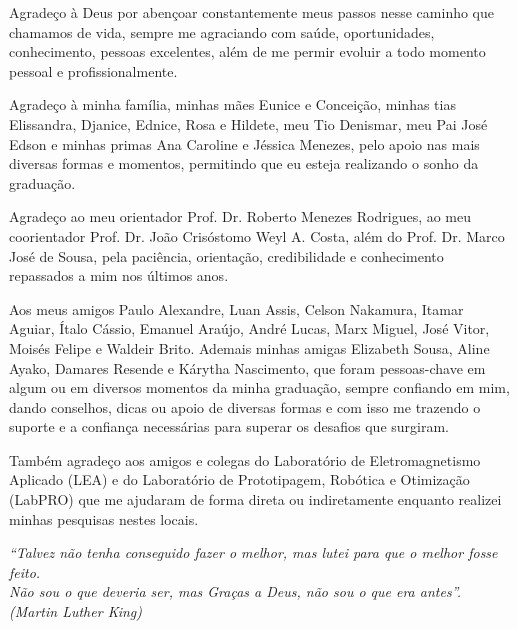 \documentclass[
	12pt,				%
	openright,			%
	oneside,			%
	a4paper,			%
	english,			%
	brazil				%
	]{abntex2}
\begin{document}
\begin{agradecimentos}
Agradeço à Deus por abençoar constantemente meus passos nesse caminho que chamamos de vida, sempre me agraciando com saúde, oportunidades, conhecimento, pessoas excelentes, além de me permir evoluir a todo momento pessoal e profissionalmente.

Agradeço à minha família, minhas mães Eunice e Conceição, minhas tias Elissandra, Djanice, Ednice, Rosa e Hildete, meu Tio Denismar, meu Pai José Edson e minhas primas Ana Caroline e Jéssica Menezes, pelo apoio nas mais diversas formas e momentos, permitindo que eu esteja realizando o sonho da graduação. 

Agradeço ao meu orientador Prof. Dr. Roberto Menezes Rodrigues, ao meu coorientador Prof. Dr. João Crisóstomo Weyl A. Costa, além do Prof. Dr. Marco José de Sousa, pela paciência, orientação, credibilidade e conhecimento repassados a mim nos últimos anos.

Aos meus amigos Paulo Alexandre, Luan Assis, Celson Nakamura, Itamar Aguiar, Ítalo Cássio, Emanuel Araújo, André Lucas, Marx Miguel, José Vitor, Moisés Felipe e Waldeir Brito. Ademais minhas amigas Elizabeth Sousa, Aline Ayako, Damares Resende e Kárytha Nascimento, que foram pessoas-chave em algum ou em diversos momentos da minha graduação, sempre confiando em mim, dando conselhos, dicas ou apoio de diversas formas e com isso me trazendo o suporte e a confiança necessárias para superar os desafios que surgiram.

	Também agradeço aos amigos e colegas do Laboratório de Eletromagnetismo Aplicado (LEA) e do Laboratório de Prototipagem, Robótica e Otimização (LabPRO) que me ajudaram de forma direta ou indiretamente enquanto realizei minhas pesquisas nestes locais.


\end{agradecimentos}

\begin{epigrafe}
    \vspace*{\fill}
	\begin{flushright}
		\textit{``Talvez não tenha conseguido fazer o melhor, mas lutei para que o melhor fosse feito. \\ Não sou o que deveria ser, mas Graças a Deus, não sou o que era antes''. \\ (Martin Luther King)}
	\end{flushright}
\end{epigrafe}
\end{document}

